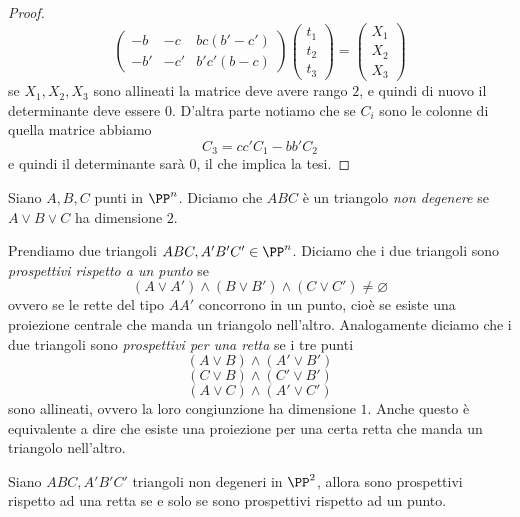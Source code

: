 \documentclass[11pt]{scrartcl}
\newcommand{\eset}{\varnothing}
\begin{document}
\begin{proof}
$$\begin{pmatrix}
   	 		-b & -c & bc(b'-c')\\
   	 		-b'& -c'& b'c'(b-c)
   	 	\end{pmatrix}\begin{pmatrix}
   	 	t_1 \\
   	 	t_2 \\
   	 	t_3
   	 	\end{pmatrix}=
   	 	\begin{pmatrix}
   	 		X_1 \\
   	 		X_2 \\
   	 		X_3
   	 	\end{pmatrix}$$
   	 	se $X_1,X_2,X_3$ sono allineati la matrice deve avere rango $2$, e quindi di nuovo il determinante deve essere $0$. D'altra parte notiamo che se $C_i$ sono le colonne di quella matrice abbiamo
   	 	$$C_3=cc'C_1-bb'C_2$$
   	 	e quindi il determinante sarà $0$, il che implica la tesi.
   	 \end{proof}
   	 \begin{definition}
   	 	Siano $A,B,C$ punti in $\PP^n$. Diciamo che $ABC$ è un triangolo \textit{non degenere} se $A\lor B\lor C$ ha dimensione $2$.
   	 \end{definition}
   	 \begin{definition}
   	 	Prendiamo due triangoli $ABC,A'B'C'\in\PP^n$. Diciamo che i due triangoli sono \textit{prospettivi rispetto a un punto} se 
   	 	$$\left(A\lor A'\right)\land\left(B\lor B'\right)\land \left(C \lor C'\right)\ne \eset$$
   	 	ovvero se le rette del tipo $AA'$ concorrono in un punto, cioè se esiste una proiezione centrale che manda un triangolo nell'altro. Analogamente diciamo che i due triangoli sono \textit{prospettivi per una retta} se i tre punti
   	 	$$\left(A\lor B\right)\land\left(A'\lor B'\right)$$
   	 	$$\left(C\lor B\right)\land\left(C'\lor B'\right)$$
   	 	$$\left(A\lor C\right)\land\left(A'\lor C'\right)$$
   	 	sono allineati, ovvero la loro congiunzione ha dimensione $1$. Anche questo è equivalente a dire che esiste una proiezione per una certa retta che manda un triangolo nell'altro.
   	 \end{definition}
   	 \begin{theorem}
   	 	Siano $ABC,A'B'C'$ triangoli non degeneri in $\PP^2$, allora sono prospettivi rispetto ad una retta se e solo se sono prospettivi rispetto ad un punto.
   	 \end{theorem}
\end{document}
